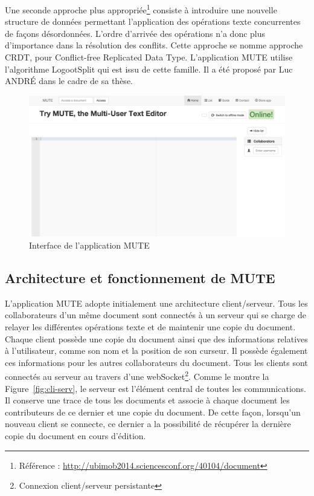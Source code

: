 \documentclass{tnreport}
\begin{document}
Une seconde approche plus appropriée\footnote{Référence  : \url{http://ubimob2014.sciencesconf.org/40104/document}} consiste à introduire une nouvelle structure de données permettant l'application des opérations texte concurrentes de façons désordonnées. L'ordre d'arrivée des opérations n'a donc plus d'importance dans la résolution des conflits. Cette approche se nomme approche CRDT, pour Conflict-free Replicated Data Type. L’application MUTE utilise l'algorithme LogootSplit qui est issu de cette famille. Il a été proposé par Luc ANDRÉ dans le cadre de sa thèse.

\begin{figure}[!h]
  \centering
  \includegraphics[width=14cm]{figures/screenshot-mute}
  \caption{Interface de l'application MUTE}
  \label{fig:screen-mute}
\end{figure}


\subsection{Architecture et fonctionnement de MUTE}

L'application MUTE adopte initialement une architecture client/serveur. Tous les collaborateurs d'un même document sont connectés à un serveur qui se charge de relayer les différentes opérations texte et de maintenir une copie du document. Chaque client possède une copie du document ainsi que des informations relatives à l'utilisateur, comme son nom et la position de son curseur. Il possède également ces informations pour les autres collaborateurs du document. Tous les clients sont connectés au serveur au travers d'une webSocket\footnote{Connexion client/serveur persistante}. Comme le montre la Figure~\ref{fig:cli-serv}, le serveur est l'élément central de toutes les communications. Il conserve une trace de tous les documents et associe à chaque document les contributeurs de ce dernier et une copie du document. De cette façon, lorsqu'un nouveau client se connecte, ce dernier a la possibilité de récupérer la dernière copie du document en cours d'édition. 
\end{document}
